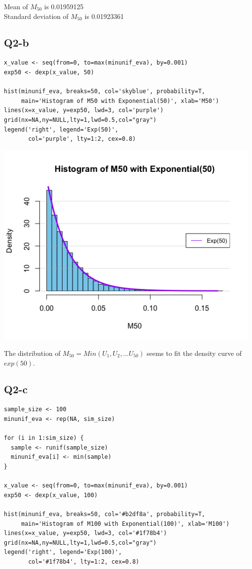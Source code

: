 \documentclass[12pt,letterpaper]{article}
\begin{document}
\noindent Mean of $M_{50}$ is 0.01959125 \\
Standard deviation of $M_{50}$ is 0.01923361\\

\newpage
\subsection*{Q2-b}
\begin{verbatim}
x_value <- seq(from=0, to=max(minunif_eva), by=0.001)
exp50 <- dexp(x_value, 50)

hist(minunif_eva, breaks=50, col='skyblue', probability=T, 
     main='Histogram of M50 with Exponential(50)', xlab='M50')
lines(x=x_value, y=exp50, lwd=3, col='purple')
grid(nx=NA,ny=NULL,lty=1,lwd=0.5,col="gray")
legend('right', legend='Exp(50)',
       col='purple', lty=1:2, cex=0.8)
\end{verbatim}

\includegraphics[width=150mm]{hist-exp50.png}

\noindent The distribution of $M_{50} = Min(U_1, U_2, ... U_{50})$ seems to fit the density curve of $exp(50)$.

\newpage
\subsection*{Q2-c}
\begin{verbatim}
sample_size <- 100
minunif_eva <- rep(NA, sim_size)

for (i in 1:sim_size) {
  sample <- runif(sample_size)
  minunif_eva[i] <- min(sample)
}

x_value <- seq(from=0, to=max(minunif_eva), by=0.001)
exp50 <- dexp(x_value, 100)

hist(minunif_eva, breaks=50, col='#b2df8a', probability=T, 
     main='Histogram of M100 with Exponential(100)', xlab='M100')
lines(x=x_value, y=exp50, lwd=3, col='#1f78b4')
grid(nx=NA,ny=NULL,lty=1,lwd=0.5,col="gray")
legend('right', legend='Exp(100)',
       col='#1f78b4', lty=1:2, cex=0.8)
\end{verbatim}
\end{document}
